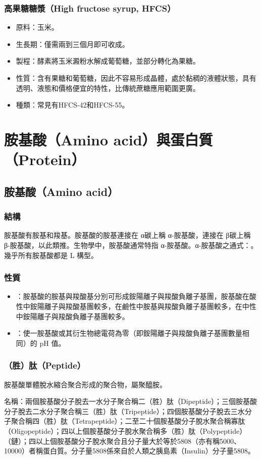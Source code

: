 \documentclass[a4paper,12pt]{report}
\begin{document}
\begin{itemize}
\begin{itemize}
\subsubsection{高果糖糖漿（High fructose syrup, HFCS）}
\begin{itemize}
\item 原料：玉米。
\item 生長期：僅需兩到三個月即可收成。
\item 製程：酵素將玉米澱粉水解成葡萄糖，並部分轉化為果糖。
\item 性質：含有果糖和葡萄糖，因此不容易形成晶體，處於黏稠的液體狀態，具有透明、液態和價格便宜的特性，比傳統蔗糖應用範圍更廣。
\item 種類：常見有HFCS-42和HFCS-55。
\end{itemize}


\section{胺基酸（Amino acid）與蛋白質（Protein）}
\subsection{胺基酸（Amino acid）}
\subsubsection{結構}
胺基酸有胺基和羧基。胺基酸的胺基連接在 α碳上稱 α-胺基酸，連接在 β碳上稱 β-胺基酸，以此類推。生物學中，胺基酸通常特指 α-胺基酸。α-胺基酸之通式：。幾乎所有胺基酸都是 L 構型。
\subsubsection{性質}
\begin{itemize}
\item {}：胺基酸的胺基與羧酸基分別可形成銨陽離子與羧酸負離子基團，胺基酸在酸性中銨陽離子與羧酸基團較多，在鹼性中胺基與羧酸負離子基團較多，在中性中銨陽離子與羧酸負離子基團較多。
\item {}：使一胺基酸或其衍生物總電荷為零（即銨陽離子與羧酸負離子基團數量相同）的 pH 值。
\end{itemize}
\subsubsection{（胜）肽（Peptide）}
胺基酸單體脫水縮合聚合形成的聚合物，屬聚醯胺。

名稱：兩個胺基酸分子脫去一水分子聚合稱二（胜）肽（Dipeptide）；三個胺基酸分子脫去二水分子聚合稱三（胜）肽（Tripeptide）；四個胺基酸分子脫去三水分子聚合稱四（胜）肽（Tetrapeptide）；二至二十個胺基酸分子脫水聚合稱寡肽（Oligopeptide）；四以上個胺基酸分子脫水聚合稱多（胜）肽（Polypeptide）（鏈）；四以上個胺基酸分子脫水聚合且分子量大於等於5808（亦有稱5000、10000）者稱蛋白質。分子量5808係來自於人類之胰島素（Insulin）分子量5808。


\end{itemize}
\end{itemize}
\end{document}
